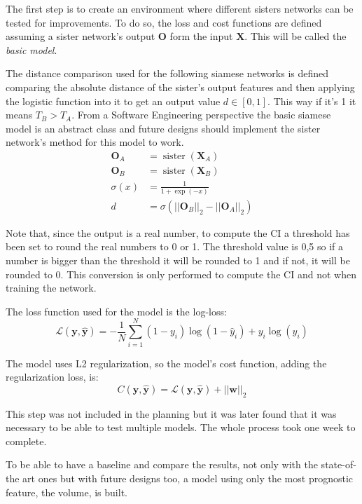 \label{sec:basic-siamese}

The first step is to create an environment where different sisters networks can be tested
for improvements. To do so, the loss and cost functions are defined assuming a sister
network's output \( \bm{O} \) form the input \( \bm{X} \). This will be called the
\emph{basic model}.

The distance comparison used for the following siamese networks is defined comparing the 
absolute distance of the sister's output features and then applying the logistic function 
into it to get an output value \( d \in [0, 1] \). This way if it's 1 it means \( T_B > T_A \).
From a Software Engineering perspective the basic siamese model is an abstract class and
future designs should implement the sister network's method for this model to work.
\begin{align*}
  \bm{O}_A &= \operatorname{sister}(\bm{X}_A) \\
  \bm{O}_B &= \operatorname{sister}(\bm{X}_B) \\
  \sigma(x) &= \frac{1}{1 + \exp(-x)} \\
  d &= \sigma(||\bm{O}_B||_2 - ||\bm{O}_A||_2) 
\end{align*}

Note that, since the output is a real number, to compute the \gls{CI} a threshold has been
set to round the real numbers to 0 or 1. The threshold value is 0,5 so if a number is 
bigger than the threshold it will be rounded to 1 and if not, it will be rounded to 0.
This conversion is only performed to compute the \gls{CI} and not when training the network.

The loss function used for the model is the log-loss:
\[
  \mathcal{L}(\bm{y}, \hat{\bm{y}}) = -\frac{1}{N} \sum_{i = 1}^{N}
  (1 - y_i)\log(1 - \hat{y}_i) + y_i\log(\hat{y}_i)
\]

The model uses L2 regularization, so the model's cost function, 
adding the regularization loss, is:
\[
  C(\bm{y}, \hat{\bm{y}}) = \mathcal{L}(\bm{y}, \hat{\bm{y}}) + 
  ||\bm{w}||_2
\]

This step was not included in the planning but it was later found that it was necessary to be 
able to test multiple models. The whole process took one week to complete.


To be able to have a baseline and compare the results, not only with the state-of-the art ones
but with future designs too, a model using only the most prognostic feature, the volume, is 
built.

